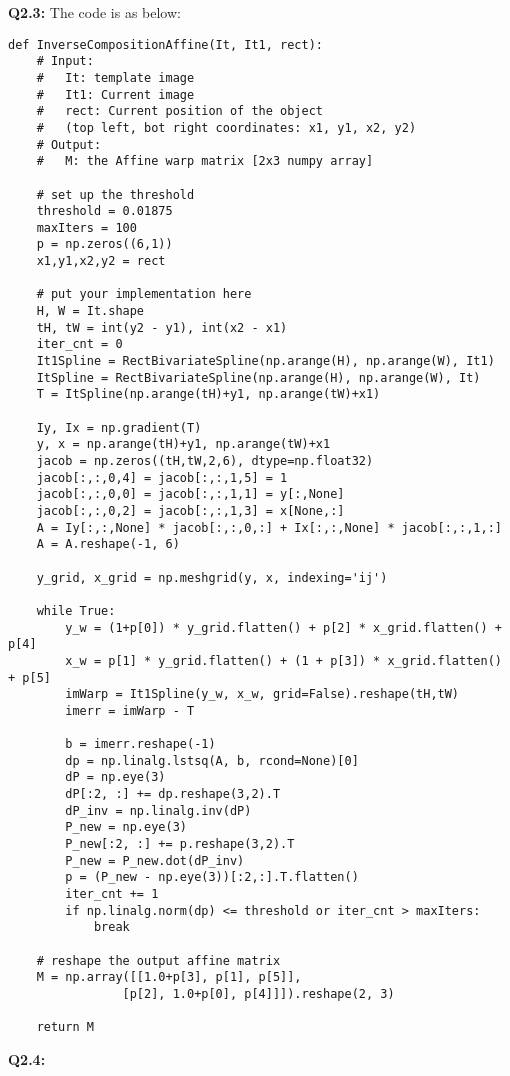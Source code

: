 \documentclass[
  course = {{16-720B Computer Vision}},
  quartile = {{1}},
  assignment = 6\ -\ Object\ Tracking\ in\ Videos,
  name = {{Kangle Deng}},
  email = {{kangled@andrew.cmu.edu}},
  firstexercise = 1
]{aga-homework}
\begin{document}
\noindent\textbf{Q2.3:}
The code is as below:
\begin{lstlisting}
def InverseCompositionAffine(It, It1, rect):
    # Input: 
    #   It: template image
    #   It1: Current image
    #   rect: Current position of the object
    #   (top left, bot right coordinates: x1, y1, x2, y2)
    # Output:
    #   M: the Affine warp matrix [2x3 numpy array]

    # set up the threshold
    threshold = 0.01875
    maxIters = 100
    p = np.zeros((6,1))
    x1,y1,x2,y2 = rect

    # put your implementation here
    H, W = It.shape
    tH, tW = int(y2 - y1), int(x2 - x1)
    iter_cnt = 0
    It1Spline = RectBivariateSpline(np.arange(H), np.arange(W), It1)
    ItSpline = RectBivariateSpline(np.arange(H), np.arange(W), It)
    T = ItSpline(np.arange(tH)+y1, np.arange(tW)+x1)

    Iy, Ix = np.gradient(T)
    y, x = np.arange(tH)+y1, np.arange(tW)+x1
    jacob = np.zeros((tH,tW,2,6), dtype=np.float32)
    jacob[:,:,0,4] = jacob[:,:,1,5] = 1
    jacob[:,:,0,0] = jacob[:,:,1,1] = y[:,None]
    jacob[:,:,0,2] = jacob[:,:,1,3] = x[None,:]
    A = Iy[:,:,None] * jacob[:,:,0,:] + Ix[:,:,None] * jacob[:,:,1,:]
    A = A.reshape(-1, 6)

    y_grid, x_grid = np.meshgrid(y, x, indexing='ij')

    while True:
        y_w = (1+p[0]) * y_grid.flatten() + p[2] * x_grid.flatten() + p[4]
        x_w = p[1] * y_grid.flatten() + (1 + p[3]) * x_grid.flatten() + p[5]
        imWarp = It1Spline(y_w, x_w, grid=False).reshape(tH,tW)
        imerr = imWarp - T

        b = imerr.reshape(-1)
        dp = np.linalg.lstsq(A, b, rcond=None)[0]
        dP = np.eye(3)
        dP[:2, :] += dp.reshape(3,2).T
        dP_inv = np.linalg.inv(dP)
        P_new = np.eye(3)
        P_new[:2, :] += p.reshape(3,2).T
        P_new = P_new.dot(dP_inv)
        p = (P_new - np.eye(3))[:2,:].T.flatten()
        iter_cnt += 1
        if np.linalg.norm(dp) <= threshold or iter_cnt > maxIters:
            break

    # reshape the output affine matrix
    M = np.array([[1.0+p[3], p[1], p[5]],
                [p[2], 1.0+p[0], p[4]]]).reshape(2, 3)

    return M
\end{lstlisting}

\noindent\textbf{Q2.4:} 
\end{document}
